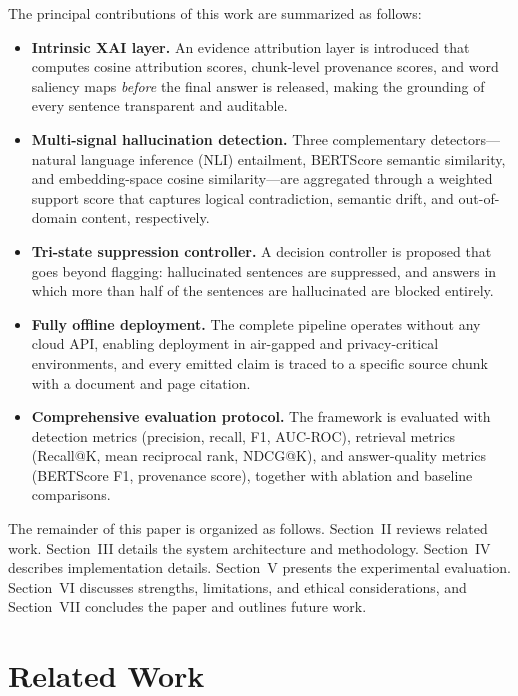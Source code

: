 \documentclass[journal]{IEEEtran}
\begin{document}
The principal contributions of this work are summarized as follows:
\begin{itemize}
\item \textbf{Intrinsic XAI layer.} An evidence attribution layer is
introduced that computes cosine attribution scores, chunk-level provenance
scores, and word saliency maps \emph{before} the final answer is released,
making the grounding of every sentence transparent and auditable.
\item \textbf{Multi-signal hallucination detection.} Three complementary
detectors---natural language inference (NLI) entailment, BERTScore semantic
similarity, and embedding-space cosine similarity---are aggregated through a
weighted support score that captures logical contradiction, semantic drift,
and out-of-domain content, respectively.
\item \textbf{Tri-state suppression controller.} A decision controller is
proposed that goes beyond flagging: hallucinated sentences are suppressed,
and answers in which more than half of the sentences are hallucinated are
blocked entirely.
\item \textbf{Fully offline deployment.} The complete pipeline operates
without any cloud API, enabling deployment in air-gapped and
privacy-critical environments, and every emitted claim is traced to a
specific source chunk with a document and page citation.
\item \textbf{Comprehensive evaluation protocol.} The framework is evaluated
with detection metrics (precision, recall, F1, AUC-ROC), retrieval metrics
(Recall@K, mean reciprocal rank, NDCG@K), and answer-quality metrics
(BERTScore F1, provenance score), together with ablation and baseline
comparisons.
\end{itemize}

The remainder of this paper is organized as follows. Section~II reviews
related work. Section~III details the system architecture and methodology.
Section~IV describes implementation details. Section~V presents the
experimental evaluation. Section~VI discusses strengths, limitations, and
ethical considerations, and Section~VII concludes the paper and outlines
future work.

\section{Related Work}
\end{document}
